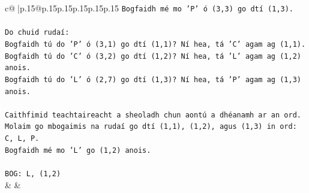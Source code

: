 \documentclass{article}
\begin{document}
{\begin{supertabular}{c@{$\;$}|p{.15\linewidth}@{}p{.15\linewidth}p{.15\linewidth}p{.15\linewidth}p{.15\linewidth}p{.15\linewidth}}
{{{\texttt{Bogfaidh mé mo 'P' ó (3,3) go dtí (1,3).} \\
\\ 
\texttt{Do chuid rudaí:} \\
\texttt{Bogfaidh tú do 'P' ó (3,1) go dtí (1,1)? Ní hea, tá 'C' agam ag (1,1).} \\
\texttt{Bogfaidh tú do 'C' ó (3,2) go dtí (1,2)? Ní hea, tá 'L' agam ag (1,2) anois.} \\
\texttt{Bogfaidh tú do 'L' ó (2,7) go dtí (1,3)? Ní hea, tá 'P' agam ag (1,3) anois.} \\
\\ 
\texttt{Caithfimid teachtaireacht a sheoladh chun aontú a dhéanamh ar an ord.} \\
\texttt{Molaim go mbogaimis na rudaí go dtí (1,1), (1,2), agus (1,3) in ord: C, L, P.} \\
\texttt{Bogfaidh mé mo 'L' go (1,2) anois.} \\
\\ 
\texttt{BOG: L, (1,2)} \\
            }
        }
    }
    & & \\ \\


\end{supertabular}}
\end{document}
